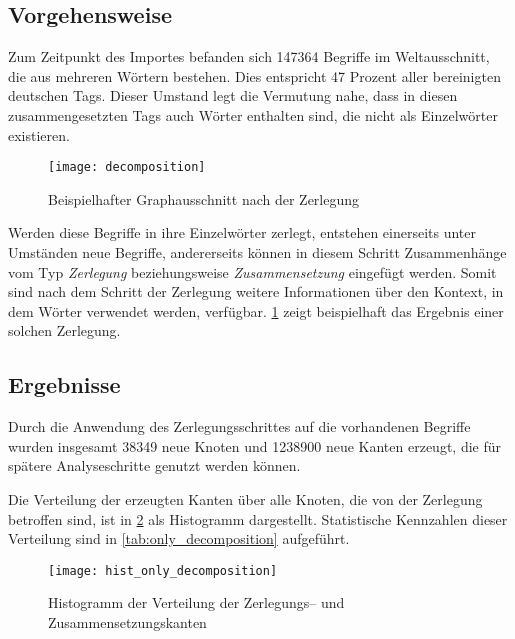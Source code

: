 \subsection{Vorgehensweise}

Zum Zeitpunkt des Importes befanden sich \num{147364} Begriffe im Weltausschnitt, die aus mehreren Wörtern bestehen. Dies entspricht \num{47} Prozent aller bereinigten deutschen Tags. Dieser Umstand legt die Vermutung nahe, dass in diesen zusammengesetzten Tags auch Wörter enthalten sind, die nicht als Einzelwörter existieren.

\begin{figure}[h]
\centering
\texttt{[image: decomposition]}
\caption{Beispielhafter Graphausschnitt nach der Zerlegung}
\label{fig:decomposition}
\end{figure}

Werden diese Begriffe in ihre Einzelwörter zerlegt, entstehen einerseits unter Umständen neue Begriffe, andererseits können in diesem Schritt Zusammenhänge vom Typ \emph{Zerlegung} beziehungsweise \emph{Zusammensetzung} eingefügt werden. Somit sind nach dem Schritt der Zerlegung weitere Informationen über den Kontext, in dem Wörter verwendet werden, verfügbar. \cref{fig:decomposition} zeigt beispielhaft das Ergebnis einer solchen Zerlegung.

\subsection{Ergebnisse}

Durch die Anwendung des Zerlegungsschrittes auf die vorhandenen Begriffe wurden insgesamt \num{38349} neue Knoten und \num{1238900} neue Kanten erzeugt, die für spätere Analyseschritte genutzt werden können.

Die Verteilung der erzeugten Kanten über alle Knoten, die von der Zerlegung betroffen sind, ist in \cref{fig:hist_only_decomposition} als Histogramm dargestellt. Statistische Kennzahlen dieser Verteilung sind in \cref{tab:only_decomposition} aufgeführt.

\begin{figure}[h]
\centering
\texttt{[image: hist\_only\_decomposition]}
\caption{Histogramm der Verteilung der Zerlegungs-- und Zusammensetzungskanten}
\label{fig:hist_only_decomposition}
\end{figure}

